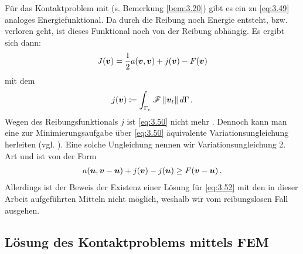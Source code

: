 \begin{bem}\label{bem:3.24}
Für das Kontaktproblem mit  (s. Bemerkung \ref{bem:3.20}) gibt es ein zu \eqref{eq:3.49} analoges Energiefunktional. Da durch die Reibung noch Energie entsteht, bzw. verloren geht, ist dieses Funktional noch von der Reibung abhängig. Es ergibt sich dann:
\begin{align}\label{eq:3.50}
	J(\boldsymbol v) = \frac 12 a(\boldsymbol v,\boldsymbol v) + j(\boldsymbol v)-F(\boldsymbol v)
\end{align}
mit dem \textit{}
\begin{align}\label{eq:3.51}
	j(\boldsymbol v) \coloneqq \int_{\Gamma_c} \mathscr F\,  \lVert \boldsymbol v_t\rVert \, d\Gamma \, .
\end{align}
Wegen des Reibungsfunktionals $j$ ist \eqref{eq:3.50} nicht mehr . Dennoch kann man eine zur Minimierungsaufgabe über \eqref{eq:3.50} äquivalente Variationsungleichung herleiten (vgl. \cite{EPSContact}). Eine solche Ungleichung nennen wir Variationsungleichung 2. Art und ist von der Form
\begin{align}\label{eq:3.52}
	a(\boldsymbol u, \boldsymbol v-\boldsymbol u) + j(\boldsymbol v) -  j(\boldsymbol u) \ge F(\boldsymbol v-\boldsymbol u) \, .
\end{align}
Allerdings ist der Beweis der Existenz einer Lösung für \eqref{eq:3.52} mit den in dieser Arbeit aufgeführten Mitteln nicht möglich, weshalb wir vom reibungslosen Fall ausgehen.
\end{bem}






\subsection{Lösung des Kontaktproblems mittels FEM}
\label{kap:3.2.3}


